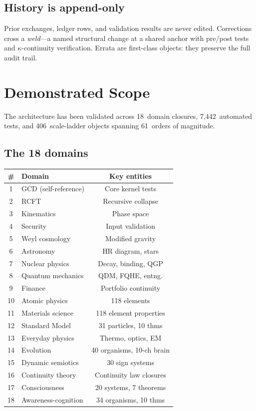 \documentclass[
  aps,
  prd,
  twocolumn,
  superscriptaddress,
  nofootinbib,
  floatfix
]{revtex4-2}
\begin{document}
\subsection{History is append-only}

Prior exchanges, ledger rows, and validation results are never
edited.  Corrections cross a \emph{weld}---a named structural
change at a shared anchor with pre/post tests and
$\kappa$-continuity verification.  Errata are first-class objects:
they preserve the full audit trail.


\section{Demonstrated Scope}\label{sec:scope}

The architecture has been validated across 18~domain closures,
7{,}442~automated tests, and 406~scale-ladder objects spanning
61~orders of magnitude.

\subsection{The 18 domains}

\begin{center}
\begin{tabular}{@{}clc@{}}
\toprule
\# & Domain & Key entities \\
\midrule
1 & GCD (self-reference) & Core kernel tests \\
2 & RCFT & Recursive collapse \\
3 & Kinematics & Phase space \\
4 & Security & Input validation \\
5 & Weyl cosmology & Modified gravity \\
6 & Astronomy & HR diagram, stars \\
7 & Nuclear physics & Decay, binding, QGP \\
8 & Quantum mechanics & QDM, FQHE, entng. \\
9 & Finance & Portfolio continuity \\
10 & Atomic physics & 118 elements \\
11 & Materials science & 118 element properties \\
12 & Standard Model & 31 particles, 10 thms \\
13 & Everyday physics & Thermo, optics, EM \\
14 & Evolution & 40 organisms, 10-ch brain \\
15 & Dynamic semiotics & 30 sign systems \\
16 & Continuity theory & Continuity law closures \\
17 & Consciousness & 20 systems, 7 theorems \\
18 & Awareness-cognition & 34 organisms, 10 thms \\
\bottomrule
\end{tabular}
\end{center}
\end{document}
